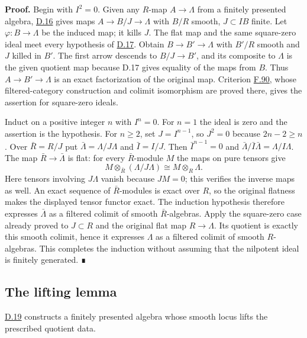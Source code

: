 \documentclass[11pt,a4paper,openany]{report}
\begin{document}
\textbf{Proof.} Begin with \(I^2=0\). Given any \(R\)-map \(A\to\Lambda\) from a finitely presented algebra, \hyperref[AG-RG-S05-smoothing-lemma-lift-once]{D.16} gives maps \(A\to B/J\to\Lambda\) with \(B/R\) smooth, \(J\subset IB\) finite. Let \(\varphi:B\to\Lambda\) be the induced map; it kills \(J\). The flat map and the same square-zero ideal meet every hypothesis of \hyperref[AG-RG-S05-smoothing-lemma-lift-twice]{D.17}. Obtain \(B\to B'\to\Lambda\) with \(B'/R\) smooth and \(J\) killed in \(B'\). The first arrow descends to \(B/J\to B'\), and its composite to \(\Lambda\) is the given quotient map because D.17 gives equality of the maps from \(B\). Thus \(A\to B'\to\Lambda\) is an exact factorization of the original map. Criterion \hyperref[AG-RG-S05-algebra-lemma-when-colimit]{F.90}, whose filtered-category construction and colimit isomorphism are proved there, gives the assertion for square-zero ideals.

Induct on a positive integer \(n\) with \(I^n=0\). For \(n=1\) the ideal is zero and the assertion is the hypothesis. For \(n\geq2\), set \(J=I^{n-1}\), so \(J^2=0\) because \(2n-2\geq n\). Over \(\bar R=R/J\) put \(\bar\Lambda=\Lambda/J\Lambda\) and \(\bar I=I/J\). Then \(\bar I^{n-1}=0\) and \(\bar\Lambda/\bar I\bar\Lambda=\Lambda/I\Lambda\). The map \(\bar R\to\bar\Lambda\) is flat: for every \(\bar R\)-module \(M\) the maps on pure tensors give \[M\otimes_{\bar R}(\Lambda/J\Lambda)\cong M\otimes_R\Lambda.\] Here tensors involving \(J\Lambda\) vanish because \(JM=0\); this verifies the inverse maps as well. An exact sequence of \(\bar R\)-modules is exact over \(R\), so the original flatness makes the displayed tensor functor exact. The induction hypothesis therefore expresses \(\bar\Lambda\) as a filtered colimit of smooth \(\bar R\)-algebras. Apply the square-zero case already proved to \(J\subset R\) and the original flat map \(R\to\Lambda\). Its quotient is exactly this smooth colimit, hence it expresses \(\Lambda\) as a filtered colimit of smooth \(R\)-algebras. This completes the induction without assuming that the nilpotent ideal is finitely generated. ∎

\subsection{The lifting lemma}\label{AG-RG-S05-the-lifting-lemma}

\label{AG-RG-S05-smoothing-section-lifting-lemma}

\hyperref[AG-RG-S05-smoothing-lemma-lifting]{D.19} constructs a finitely presented algebra whose smooth locus lifts the prescribed quotient data.
\end{document}
